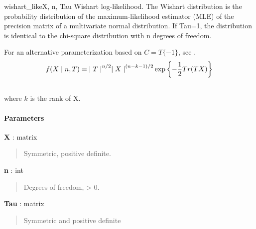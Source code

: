 \begin{funcdesc}{wishart\_like}{X, n, Tau}
\hypertarget{pymc.distributions.wishart_like}{}
Wishart log-likelihood. The Wishart distribution is the probability
distribution of the maximum-likelihood estimator (MLE) of the precision
matrix of a multivariate normal distribution. If Tau=1, the distribution
is identical to the chi-square distribution with n degrees of freedom.

For an alternative parameterization based on $C=T\{-1\}$, see 
\hyperlink{pymc.distributions.wishart_cov_like}{}.
\begin{gather}
\begin{split}f(X \mid n, T) = {\mid T \mid}^{n/2}{\mid X \mid}^{(n-k-1)/2} \exp\left\{ -\frac{1}{2} Tr(TX) \right\}\end{split}\notag\\\begin{split}\end{split}\notag
\end{gather}
where $k$ is the rank of X.
\paragraph{Parameters}\begin{paramlist}

\item[] \textbf{X} : matrix
\begin{quote}

Symmetric, positive definite.
\end{quote}

\item[] \textbf{n} : int
\begin{quote}

Degrees of freedom, \textgreater{} 0.
\end{quote}

\item[] \textbf{Tau} : matrix
\begin{quote}

Symmetric and positive definite
\end{quote}
\end{paramlist}
\end{funcdesc}


